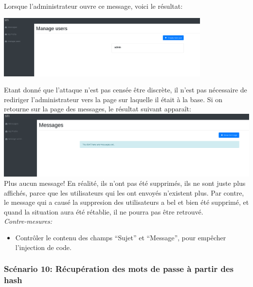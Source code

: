 \documentclass{article}
\begin{document}
Lorsque l'administrateur ouvre ce message, voici le résultat:\\

\begin{center}\includegraphics[width=0.8\textwidth]{images/users2.PNG}\end{center}

Etant donné que l'attaque n'est pas censée être discrète, il n'est pas
nécessaire de rediriger l'administrateur vers la page sur laquelle il
était à la base. Si on retourne sur la page des messages, le résultat
suivant apparaît:\\

\includegraphics[width=\textwidth]{images/users3.PNG}\\

Plus aucun message! En réalité, ils n'ont pas été supprimés, ils ne sont
juste plus affichés, parce que les utilisateurs qui les ont envoyés
n'existent plus. Par contre, le message qui a causé la suppresion des
utilisateurs a bel et bien été supprimé, et quand la situation aura été
rétablie, il ne pourra pas être retrouvé.\\

\textit{Contre-mesures:}

\begin{itemize}

\item
  Contrôler le contenu des champs ``Sujet'' et ``Message'', pour
  empêcher l'injection de code.
\end{itemize}

\subsubsection{Scénario 10: Récupération des mots de passe à partir des
hash}
\end{document}
